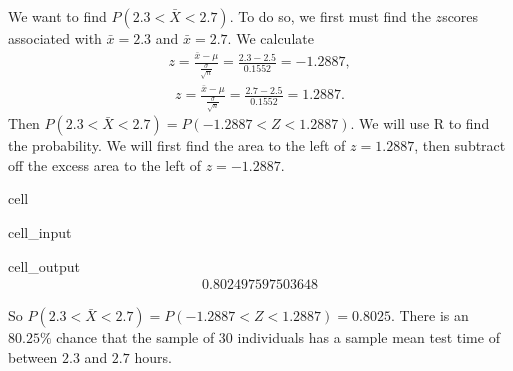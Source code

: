 \documentclass[letterpaper,10pt,english]{jupyterBook}
\begin{document}
\sphinxAtStartPar
We want to find \(P(2.3 < \bar{X} < 2.7)\). To do so, we first must find the \(z\)\sphinxhyphen{}scores associated with \(\bar{x} = 2.3\) and \(\bar{x} = 2.7\). We calculate
\begin{equation*}
\begin{split} z = \frac{\bar{x} - \mu}{\frac{\sigma}{\sqrt{n}}} = \frac{2.3 - 2.5}{0.1552} = -1.2887, \end{split}
\end{equation*}\begin{equation*}
\begin{split} z = \frac{\bar{x} - \mu}{\frac{\sigma}{\sqrt{n}}} = \frac{2.7 - 2.5}{0.1552} = 1.2887. \end{split}
\end{equation*}
\sphinxAtStartPar
Then \(P(2.3 < \bar{X} < 2.7) = P(-1.2887 < Z < 1.2887)\). We will use R to find the probability. We will first find  the area to the left of \(z = 1.2887\), then subtract off the excess area to the left of \(z = -1.2887\).

\begin{sphinxuseclass}{cell}\begin{sphinxVerbatimInput}

\begin{sphinxuseclass}{cell_input}
\begin{sphinxVerbatim}[commandchars=\\\{\}]
\end{sphinxVerbatim}

\end{sphinxuseclass}\end{sphinxVerbatimInput}
\begin{sphinxVerbatimOutput}

\begin{sphinxuseclass}{cell_output}\begin{equation*}
\begin{split}0.802497597503648\end{split}
\end{equation*}
\end{sphinxuseclass}\end{sphinxVerbatimOutput}

\end{sphinxuseclass}
\sphinxAtStartPar
So \(P(2.3 < \bar{X} < 2.7) = P(-1.2887 < Z < 1.2887) = 0.8025\). There is an \(80.25\%\) chance that the sample of \(30\) individuals has a sample mean test time of between \(2.3\) and \(2.7\) hours.
\end{document}
